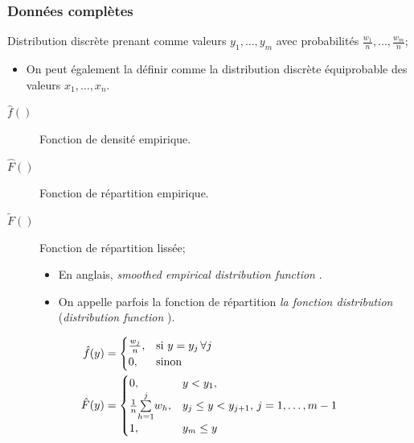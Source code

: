 \documentclass[french]{article}
\begin{document}
\begin{multicols*}{2}
\subsubsection{Données complètes}
\begin{definitionNOHFILL}
Distribution discrète prenant comme valeurs $y_{1}, \dots, y_{m}$ avec probabilités $\frac{w_{1}}{n}, \dots, \frac{w_{m}}{n}$;
\begin{itemize}
	\item	On peut également la définir comme la distribution discrète équiprobable des valeurs $x_{1}, \dots, x_{n}$.
\end{itemize}
\end{definitionNOHFILL}

\begin{distributions}[Notation]
\begin{description}
	\item[$\hat{f}()$]	Fonction de densité empirique.	
	\item[$\hat{F}()$]	Fonction de répartition empirique.	
	\item[$\tilde{F}()$]	Fonction de répartition lissée;
		\begin{itemize}
		\item	En anglais, \og \textit{smoothed empirical distribution function} \fg{}.
		\item	On appelle parfois la fonction de répartition \textit{la fonction distribution} (\og \textit{distribution function} \fg{}).
		\end{itemize}
\end{description}
\end{distributions}

\begin{align*}
	\hat{f}(y)
	&=	\begin{cases}
		\frac{w_{j}}{n},	&	\text{si } y = y_{j} \, \forall j	\\
		0,	&	\text{sinon}
		\end{cases}	\\
		\hat{F}(y)
	&=	\begin{cases}
		0,	&	y	<	y_{1},	\\
		\frac{1}{n}\overset{j}{\underset{h = 1}{\sum}}w_{h},	&	y_{j}	\leq	y	<	y_{j + 1}, \, j	=	1, \dots, m - 1	\\
		1,	&	y_{m}	\leq	y
		\end{cases}
\end{align*}		


\end{multicols*}
\end{document}

